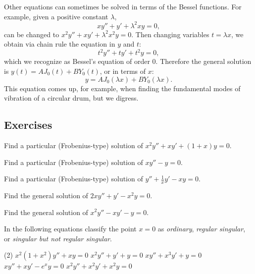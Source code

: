 \begin{example}
Other equations can sometimes be solved in terms of the Bessel functions.
For example, given a positive constant $\lambda$,
\begin{equation*}
x y'' + y' + \lambda^2 x y = 0 ,
\end{equation*}
can be changed to 
$x^2 y'' + x y' + \lambda^2 x^2 y = 0$.  Then changing variables
$t = \lambda x$, we obtain via chain rule the equation in $y$ and $t$:
\begin{equation*}
t^2 y'' + t y' + t^2 y = 0 ,
\end{equation*}
which we recognize as Bessel's equation of order 0.  Therefore the
general solution is $y(t) = A J_0(t) + B Y_0(t)$, or in terms of $x$:
\begin{equation*}
y = A J_0(\lambda x) + B Y_0(\lambda x) .
\end{equation*}
This equation comes up, for example, when finding the fundamental modes of
vibration of a circular drum, but we digress.
\end{example}

\subsection{Exercises}

\begin{exercise}
Find a particular (Frobenius-type) solution of $x^2 y'' + x y' + (1+x) y = 0$.
\end{exercise}

\begin{exercise}
Find a particular (Frobenius-type) solution of $x y'' - y = 0$.
\end{exercise}

\begin{exercise}
Find a particular (Frobenius-type) solution of $y'' +\frac{1}{x}y' - xy = 0$.
\end{exercise}

\begin{exercise}
Find the general solution of $2 x y'' + y' - x^2 y = 0$.
\end{exercise}

\begin{exercise}
Find the general solution of $x^2 y'' - x y' -y = 0$.
\end{exercise}

\begin{exercise}
In the following equations
classify the point $x=0$ as \emph{ordinary}, \emph{regular singular}, or
\emph{singular but not regular singular}.
\begin{tasks}(2)
\task $x^2(1+x^2)y''+xy=0$
\task $x^2y''+y'+y=0$
\task $xy''+x^3y'+y=0$
\task $xy''+xy'-e^xy=0$
\task $x^2y''+x^2y'+x^2y=0$
\end{tasks}
\end{exercise}

